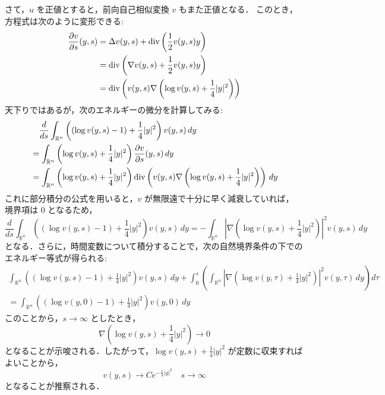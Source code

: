 \documentclass[paper=a4,
fontsize=12pt,
reqno,
uplatex,
dvipdfmx]{jlreq}
\theoremstyle{definition} %
\begin{document}
さて，$u$ を正値とすると，前向自己相似変換 $v$ もまた正値となる．
このとき，方程式は次のように変形できる: 
\begin{align}
 \frac{\partial v}{\partial s}(y,s)
 &=
 \Delta v(y,s)
 +
 \text{div} 
 \left(
 \frac{1}{2} v(y, s) y
 \right) \\
 &= \operatorname{div}
 \left(
 \nabla v(y, s)
 + 
 \frac{1}{2} v(y, s) y
 \right) \\
 &= \operatorname{div}
 \left(
 v(y, s)
 \nabla
 \left( 
 \log v(y, s) + \frac{1}{4} |y|^2
 \right) 
 \right)
\end{align}
天下りではあるが，次のエネルギーの微分を計算してみる:
\begin{align}
 &\quad
 \frac{d}{ds}
  \int_{\mathbb{R}^n}
  \left( 
  (\log v(y, s) - 1)
  + 
  \frac{1}{4} |y|^2
  \right)
  v(y, s)
  \, dy
 \\
  &=
  \int_{\mathbb{R}^n} 
  \left(
  \log v(y, s) + \frac{1}{4} |y|^2 
  \right)
  \frac{\partial v}{\partial s}(y,s)
  \, dy
  \\
  &=
  \int_{\mathbb{R}^n}
  \left(
  \log v(y, s) + \frac{1}{4} |y|^2 
  \right) 
  \operatorname{div}
  \left(
  v(y,s)
  \nabla 
  \left(
  \log v(y,s)
  + 
  \frac{1}{4} |y|^2
  \right)
  \right)
  \,dy
 \end{align}
これに部分積分の公式を用いると，$v$ が無限遠で十分に早く減衰していれば，
境界項は $0$ となるため，
\begin{equation}
 \frac{d}{ds} 
  \int_{\mathbb{R}^n}
  \left(
   (\log v(y, s) - 1) + \frac{1}{4} |y|^2
  \right)
  v(y, s)
  \, dy 
  =
  -\int_{\mathbb{R}^n}
  \left|
   \nabla 
   \left( 
    \log v(y, s) + \frac{1}{4} |y|^2
   \right) 
  \right|^2 v(y, s)
  \, dy
\end{equation}
となる．さらに，時間変数について積分することで，次の自然境界条件の下での
エネルギー等式が得られる:
\begin{multline}
 \int_{\mathbb{R}^n}
 \left( 
 (\log v(y, s) - 1) + \frac{1}{4} |y|^2
 \right) v(y, s)
 \, dy
 +
 \int_{0}^s
 \left(
 \int_{\mathbb{R}^n}
 \left|
 \nabla 
 \left(
 \log v(y, \tau)
 + 
 \frac{1}{4} |y|^2 
 \right)
 \right|^2
 v(y, \tau)
 \, dy 
 \right)
 d\tau \\
 = 
 \int_{\mathbb{R}^n}
 \left( 
 (\log v(y, 0) - 1) + \frac{1}{4} |y|^2
 \right)
 v(y, 0)
 \, dy 
\end{multline}
このことから，$s \rightarrow \infty$ としたとき，
\begin{equation}
 \nabla
  \left(
   \log v(y, s)
   +
   \frac{1}{4} |y|^2
  \right) 
  \rightarrow 
  0
\end{equation}
となることが示唆される．したがって，$\log v(y, s) + \frac{1}{4} |y|^2$
が定数に収束すればよいことから，
\begin{equation}
 v(y, s) 
  \rightarrow
  C e^{-\frac{1}{4} |y|^2}
  \quad 
  s \rightarrow \infty
\end{equation}
となることが推察される．
\end{document}
